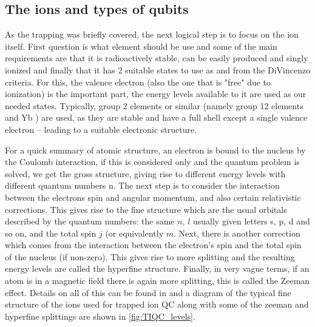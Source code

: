 \subsection{The ions and types of qubits}\label{sec:trapqbit}
As the trapping was briefly covered, the next logical step is to focus on the ion itself.
First question is what element should be use and some of the main requirements are that it is radioactively stable, can be easily produced and singly ionized and finally that it has 2 suitable states to use as \kz and \ko from the DiVincenzo criteria.
For this, the valence electron (also the one that is "free" due to ionization) is the important part, the energy levels available to it are used as our needed states.
Typically, group 2 elements or similar (namely group 12 elements and Yb \cite{ozeriTrappedionQubitTool2011}) are used, as they are stable and have a full shell except a single valence electron -- leading to a suitable electronic structure.

For a quick summary of atomic structure, an electron is bound to the nucleus by the Coulomb interaction, if this is considered only and the quantum problem is solved, we get the gross structure, giving rise to different energy levels with different quantum numbers n.
The next step is to consider the interaction between the electrons spin and angular momentum, and also certain relativistic corrections.
This gives rise to the fine structure which are the usual orbitals described by the quantum numbers: the same $n$, $l$ usually given letters s, p, d and so on, and the total spin $j$ (or equivalently $m$.
Next, there is another correction which comes from the interaction between the electron's spin and the total spin of the nucleus (if non-zero).
This gives rise to more splitting and the resulting energy levels are called the hyperfine structure.
Finally, in very vague terms, if an atom is in a magnetic field there is again more splitting, this is called the Zeeman effect.
Details on all of this can be found in \cite{woodgateELEMENTARYATOMICSTRUCTURE1970} and a diagram of the typical fine structure of the ions used for trapped ion QC along with some of the zeeman and hyperfine splittings are shown in \cref{fig:TIQC_levels}.


